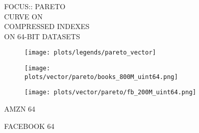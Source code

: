 \documentclass{article}
\begin{document}
\begin{figure}[!htbp]
\fbox
{
\begin{minipage}[t][0.98\textheight][t]{\textwidth}
\centering
    \begin{minipage}{0.23\linewidth}
    \footnotesize{FOCUS::  PARETO\\ CURVE ON \\ COMPRESSED INDEXES \\ ON 64-BIT DATASETS}
    \end{minipage}
   \begin{minipage}{0.75\linewidth}
        \begin{figure}[H]
        \texttt{[image: plots/legends/pareto\_vector]}
        \end{figure}
    \end{minipage}
    \vfill

   \begin{minipage}{0.48\linewidth}
        \begin{figure}[H]
        \texttt{[image: plots/vector/pareto/books\_800M\_uint64.png]}
        \end{figure}
    \end{minipage}
    \begin{minipage}{0.48\linewidth}
        \begin{figure}[H]
        \texttt{[image: plots/vector/pareto/fb\_200M\_uint64.png]}
        \end{figure}
    \end{minipage}
    \begin{minipage}{0.48\linewidth}
    \begin{center}
        AMZN 64
    \end{center}
    \end{minipage}
    \begin{minipage}{0.48\linewidth}
    \begin{center}
        FACEBOOK 64
    \end{center}
    \end{minipage}

    \vfill


\end{minipage}}
\end{figure}
\end{document}
